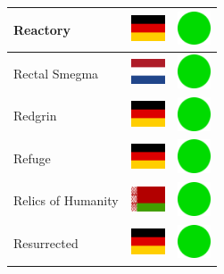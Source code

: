 \documentclass[12pt, a4paper, twoside]{report}
\begin{document}
\begin{center}
\begin{longtable}{|p{5cm}|p{2cm}|p{2cm}|}
 Reactory                                                   & \includegraphics[width=1cm]{4x3/de} &   \includegraphics[width=1cm]{likes/y} \\ \hline
 Rectal Smegma                                              & \includegraphics[width=1cm]{4x3/nl} &   \includegraphics[width=1cm]{likes/y} \\ \hline
 Redgrin                                                    & \includegraphics[width=1cm]{4x3/de} &   \includegraphics[width=1cm]{likes/y} \\ \hline
 Refuge                                                     & \includegraphics[width=1cm]{4x3/de} &   \includegraphics[width=1cm]{likes/y} \\ \hline
 Relics of Humanity                                         & \includegraphics[width=1cm]{4x3/by} &   \includegraphics[width=1cm]{likes/y} \\ \hline
 Resurrected                                                & \includegraphics[width=1cm]{4x3/de} &   \includegraphics[width=1cm]{likes/y} \\ \hline

\end{longtable}
\end{center}
\end{document}
